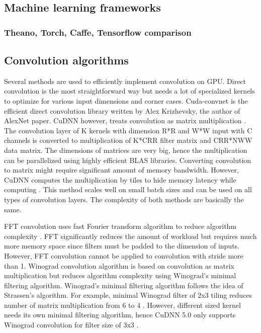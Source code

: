 \documentclass[conference]{IEEEtran}
\begin{document}
\subsection{Machine learning frameworks}

\subsubsection{Theano, Torch, Caffe, Tensorflow comparison}

\subsection{Convolution algorithms}
Several methods are used to efficiently implement convolution on GPU.
Direct convolution is the most straightforward way but needs a lot of specialized kernels to optimize for various input dimensions and corner cases.
Cuda-convnet \cite{} is the efficient direct convolution library written by Alex Krizhevsky, the author of AlexNet paper.
CuDNN however, treats convolution as matrix multiplication \cite{}.
The convolution layer of K kernels with dimension R*R and W*W input with C channels is converted to multiplication of K*CRR filter matrix and CRR*NWW data matrix.
The dimensions of matrices are very big, hence the multiplication can be parallelized using highly efficient BLAS libraries.
Converting convolution to matrix might require significant amount of memory bandwidth.
However, CuDNN computes the multiplication by tiles to hide memory latency while computing \cite{}.
This method scales well on small batch sizes and can be used on all types of convolution layers.
The complexity of both methods are basically the same.

FFT convolution uses fast Fourier transform algorithm to reduce algorithm complexity \cite{}.
FFT significantly reduces the amount of workload but requires much more memory space since filters must be padded to the dimension of inputs.
However, FFT convolution cannot be applied to convolution with stride more than 1.
Winograd convolution algorithm is based on convolution as matrix multiplication but reduces algorithm complexity using Winograd's minimal filtering algorithm.
Winograd’s minimal filtering algorithm follows the idea of Strassen’s algorithm.
For example, minimal Winograd filter of 2x3 tiling reduces number of matrix multiplication from 6 to 4 \cite{}.
However, different sized kernel needs its own minimal filtering algorithm, hence CuDNN 5.0 only supports Winograd convolution for filter size of 3x3 \cite{}.
\end{document}
